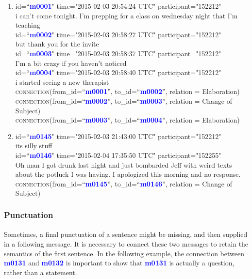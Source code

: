 \documentclass{article}
\begin{document}
\begin{enumerate}[resume]
\item id=``\textbf{\textcolor{blue}{m0001}}" time="2015-02-03 20:54:24 UTC" participant="152212"\\
i can't come tonight. I'm prepping for a class on wednesday night that I'm teaching\\
id=``\textbf{\textcolor{blue}{m0002}}" time="2015-02-03 20:58:27 UTC" participant="152212"\\
but thank you for the invite\\
id=``\textbf{\textcolor{blue}{m0003}}" time="2015-02-03 20:58:37 UTC" participant="152212"\\
I'm a bit crazy if you haven't noticed\\
id=``\textbf{\textcolor{blue}{m0004}}" time="2015-02-03 20:58:40 UTC" participant="152212"\\
i started seeing a new therapist\\
\textsc{connection}(from\_id=``\textbf{\textcolor{blue}{m0001}}'', to\_id=``\textbf{\textcolor{blue}{m0002}}'', relation = Elaboration)\\
\textsc{connection}(from\_id=``\textbf{\textcolor{blue}{m0002}}'', to\_id=``\textbf{\textcolor{blue}{m0003}}'', relation = Change of Subject)\\
\textsc{connection}(from\_id=``\textbf{\textcolor{blue}{m0003}}'', to\_id=``\textbf{\textcolor{blue}{m0004}}'', relation = Elaboration)
\item id=``\textbf{\textcolor{blue}{m0145}}" time="2015-02-03 21:43:00 UTC" participant="152212"\\
its silly stuff\\
id=``\textbf{\textcolor{blue}{m0146}}" time="2015-02-04 17:35:50 UTC" participant="152255"\\
Oh man I got drunk last night and just bombarded Jeff with weird texts about the potluck I was having. I apologized this morning and no response.\\
\textsc{connection}(from\_id=``\textbf{\textcolor{blue}{m0145}}'', to\_id=``\textbf{\textcolor{blue}{m0146}}'', relation = Change of Subject)
\end{enumerate}


\subsubsection{Punctuation}
\paragraph{}
Sometimes, a final punctuation of a sentence might be missing, and then supplied in a following message. It is necessary to connect these two messages to retain the semantics of the first sentence. In the following example, the connection between \textbf{\textcolor{blue}{m0131}} and \textbf{\textcolor{blue}{m0132}} is important to show that \textbf{\textcolor{blue}{m0131}} is actually a question, rather than a statement.
\end{document}
